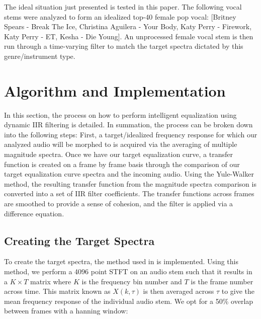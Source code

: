 \documentclass{article}
\begin{document}
The ideal situation just presented is tested in this paper.  The following vocal stems were analyzed to form an idealized top-40 female pop vocal: [Britney Spears - Break The Ice, Christina Aguilera - Your Body, Katy Perry - Firework, Katy Perry - ET, Kesha - Die Young].  An unprocessed female vocal stem is then run through a time-varying filter to match the target spectra dictated by this genre/instrument type.

\section{Algorithm and Implementation}\label{sec:Algorithm and Implementation}

In this section, the process on how to perform intelligent equalization using dynamic IIR filtering is detailed.  In summation, the process can be broken down into the following steps: First, a target/idealized frequency response for which our analyzed audio will be morphed to is acquired via the averaging of multiple magnitude spectra.  Once we have our target equalization curve, a transfer function is created on a frame by frame basis through the comparison of our target equalization curve spectra and the incoming audio.  Using the Yule-Walker method, the resulting transfer function from the magnitude spectra comparison is converted into a set of IIR filter coefficients.  The transfer functions across frames are smoothed to provide a sense of cohesion, and the filter is applied via a difference equation.

\subsection{Creating the Target Spectra}
\label{subsec:Creating the Target Spectra}

To create the target spectra, the method used in \cite{pestana2013spectral} is implemented.  Using this method, we perform a 4096 point STFT on an audio stem such that it results in a $K \times T$ matrix where $K$ is the frequency bin number and $T$ is the frame number across time.  This matrix known as $X(k,\tau)$ is then averaged across $\tau$ to give the mean frequency response of the individual audio stem.  We opt for a 50\% overlap between frames with a hanning window:
\end{document}

